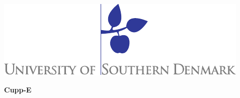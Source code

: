\begin{titlepage}%
\begin{flushright}
\includegraphics[scale=0.73]{content/00_frontmatter/sdu_logo.pdf}
\end{flushright}
\vspace*{2.7cm}
\setlength{\extrarowheight}{0pt}
\textsf{\Huge{\textbf{\textcolor{FrontpageHeadingColor}{Cupp-E}}}}\\
\vspace*{0.5cm}

\end{titlepage}
